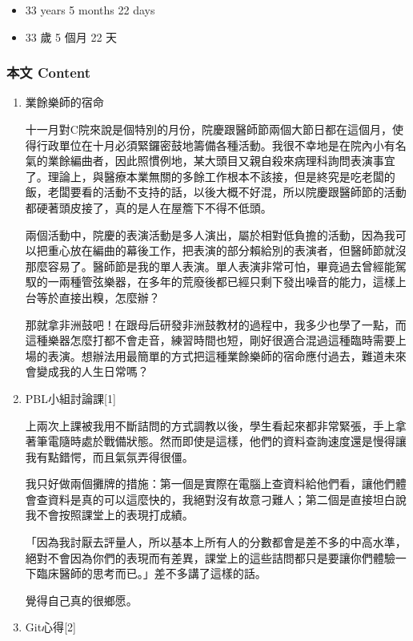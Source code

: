 \documentclass[a5paper, 12pt
]{book}
\providecommand{\tightlist}{%
  \setlength{\itemsep}{0pt}\setlength{\parskip}{0pt}}
\begin{document}
\begin{itemize}
\tightlist
\item
  33 years 5 months 22 days
\item
  33 歲 5 個月 22 天
\end{itemize}

\hypertarget{ux672cux6587-content-14}{%
\subsubsection{本文 Content}\label{ux672cux6587-content-14}}

\begin{enumerate}
\def\labelenumi{\arabic{enumi}.}
\item
  業餘樂師的宿命

  十一月對C院來說是個特別的月份，院慶跟醫師節兩個大節日都在這個月，使得行政單位在十月必須緊鑼密鼓地籌備各種活動。我很不幸地是在院內小有名氣的業餘編曲者，因此照慣例地，某大頭目又親自殺來病理科詢問表演事宜了。理論上，與醫療本業無關的多餘工作根本不該接，但是終究是吃老闆的飯，老闆要看的活動不支持的話，以後大概不好混，所以院慶跟醫師節的活動都硬著頭皮接了，真的是人在屋簷下不得不低頭。

  兩個活動中，院慶的表演活動是多人演出，屬於相對低負擔的活動，因為我可以把重心放在編曲的幕後工作，把表演的部分賴給別的表演者，但醫師節就沒那麼容易了。醫師節是我的單人表演。單人表演非常可怕，畢竟過去曾經能駕馭的一兩種管弦樂器，在多年的荒廢後都已經只剩下發出噪音的能力，這樣上台等於直接出糗，怎麼辦？

  那就拿非洲鼓吧！在跟母后研發非洲鼓教材的過程中，我多少也學了一點，而這種樂器怎麼打都不會走音，練習時間也短，剛好很適合混過這種臨時需要上場的表演。想辦法用最簡單的方式把這種業餘樂師的宿命應付過去，難道未來會變成我的人生日常嗎？
\item
  PBL小組討論課{[}1{]}

  上兩次上課被我用不斷詰問的方式調教以後，學生看起來都非常緊張，手上拿著筆電隨時處於戰備狀態。然而即使是這樣，他們的資料查詢速度還是慢得讓我有點錯愕，而且氣氛弄得很僵。

  我只好做兩個攤牌的措施：第一個是實際在電腦上查資料給他們看，讓他們體會查資料是真的可以這麼快的，我絕對沒有故意刁難人；第二個是直接坦白說我不會按照課堂上的表現打成績。

  「因為我討厭去評量人，所以基本上所有人的分數都會是差不多的中高水準，絕對不會因為你們的表現而有差異，課堂上的這些詰問都只是要讓你們體驗一下臨床醫師的思考而已。」差不多講了這樣的話。

  覺得自己真的很鄉愿。
\item
  Git心得{[}2{]}


\end{enumerate}
\end{document}
